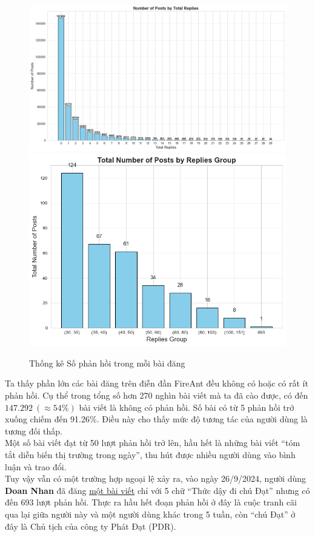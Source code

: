 \begin{figure}[H]
    \centering
    \includegraphics[width = 1\linewidth]{images/C2_pic57.png}
    \includegraphics[width = 0.7\linewidth]{images/C2_pic56.png}
    \vspace{-1em}
    \caption{Thống kê Số phản hồi trong mỗi bài đăng}
\end{figure}

Ta thấy phần lớn các bài đăng trên điễn đần FireAnt đều không có hoặc có rất ít phản hồi. Cụ thể trong tổng số hơn 270 nghìn bài viết mà ta đã cào được, có đến $147.292\ (\approx54\%)$ bài viết là không có phản hồi. Số bài có từ 5 phản hồi trở xuống chiếm đến 91.26\%. Điều này cho thấy mức độ tương tác của người dùng là tương đối thấp.\\

Một số bài viết đạt từ 50 lượt phản hồi trở lên, hầu hết là những bài viết ``tóm tắt diễn biến thị trường trong ngày'', thu hút được nhiều người dùng vào bình luận và trao đổi.\\

Tuy vậy vẫn có một trường hợp ngoại lệ xảy ra, vào ngày 26/9/2024, người dùng \textbf{Doan Nhan} đã đăng \href{https://fireant.vn/dashboard/content/posts/28340183/replies}{một bài viết} chỉ với 5 chữ ``Thức dậy đi chú Đạt'' nhưng có đến 693 lượt phản hồi. Thực ra hầu hết đoạn phản hồi ở đây là cuộc tranh cãi qua lại giữa người này và một người dùng khác trong 5 tuần, còn ``chú Đạt'' ở đây là Chủ tịch của công ty Phát Đạt (PDR).

